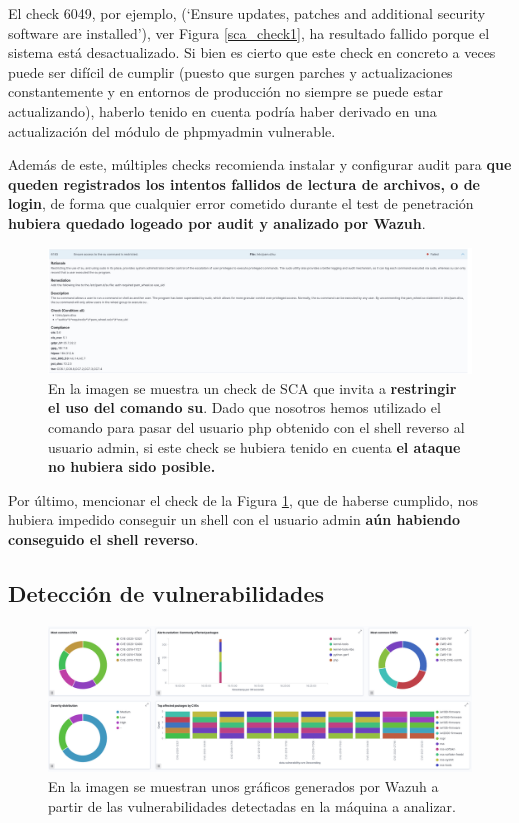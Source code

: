 El check 6049, por ejemplo, (`Ensure updates, patches and additional security software are installed'), ver Figura \ref{sca_check1}, ha resultado fallido porque el sistema está desactualizado. Si bien es cierto que este check en concreto a veces puede ser difícil de cumplir (puesto que surgen parches y actualizaciones constantemente y en entornos de producción no siempre se puede estar actualizando), haberlo tenido en cuenta podría haber derivado en una actualización del módulo de phpmyadmin vulnerable.

Además de este, múltiples checks recomienda instalar y configurar audit para \textbf{que queden registrados los intentos fallidos de lectura de archivos, o de login}, de forma que cualquier error cometido durante el test de penetración \textbf{hubiera quedado logeado por audit y analizado por Wazuh}.

\begin{figure}[!hbt]
  \centering
  \includegraphics[width=\textwidth]{imagenes/sca_check2.png}
  \caption{En la imagen se muestra un check de SCA que invita a \textbf{restringir el uso del comando su}. Dado que nosotros hemos utilizado el comando para pasar del usuario php obtenido con el shell reverso al usuario admin, si este check se hubiera tenido en cuenta \textbf{el ataque no hubiera sido posible.}}
   \label{sca_check2}
\end{figure}

Por último, mencionar el check de la Figura \ref{sca_check2}, que de haberse cumplido, nos hubiera impedido conseguir un shell con el usuario admin \textbf{aún habiendo conseguido el shell reverso}.

\subsection{Detección de vulnerabilidades}

\begin{figure}[!hbt]
  \centering
  \includegraphics[width=\textwidth]{imagenes/vulnerabilities.png}
  \caption{En la imagen se muestran unos gráficos generados por Wazuh a partir de las vulnerabilidades detectadas en la máquina a analizar.}
   \label{vulnerabilities}
\end{figure}

